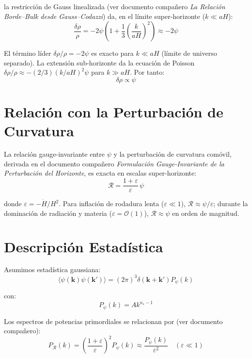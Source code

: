 \documentclass[12pt,a4paper]{article}
\begin{document}
la restricción de Gauss linealizada (ver documento compañero \textit{La Relación Borde--Bulk desde Gauss--Codazzi}) da, en el límite super-horizonte ($k \ll aH$):
\begin{equation}
\frac{\delta\rho}{\rho} = -2\psi\!\left(1 + \frac{1}{3}\!\left(\frac{k}{aH}\right)^{\!2}\right) \approx -2\psi \tag{16}
\end{equation}

El término líder $\delta\rho/\rho = -2\psi$ es exacto para $k \ll aH$ (límite de universo separado). La extensión sub-horizonte da la ecuación de Poisson $\delta\rho/\rho \approx -(2/3)(k/aH)^2\psi$ para $k \gg aH$. Por tanto:
\begin{equation}
\delta\rho \propto \psi \tag{17}
\end{equation}

\section{Relación con la Perturbación de Curvatura}

La relación gauge-invariante entre $\psi$ y la perturbación de curvatura comóvil, derivada en el documento compañero \textit{Formulación Gauge-Invariante de la Perturbación del Horizonte}, es exacta en escalas super-horizonte:
\begin{equation}
\mathcal{R} = \frac{1+\varepsilon}{\varepsilon}\,\psi \tag{18}
\end{equation}

donde $\varepsilon = -\dot{H}/H^2$. Para inflación de rodadura lenta ($\varepsilon \ll 1$), $\mathcal{R} \approx \psi/\varepsilon$; durante la dominación de radiación y materia ($\varepsilon = \mathcal{O}(1)$), $\mathcal{R} \approx \psi$ en orden de magnitud.

\section{Descripción Estadística}

Asumimos estadística gaussiana:
\begin{equation}
\langle\psi(\mathbf{k})\psi(\mathbf{k}')\rangle = (2\pi)^3\delta(\mathbf{k} + \mathbf{k}')P_\psi(k) \tag{19}
\end{equation}

con:
\begin{equation}
P_\psi(k) = Ak^{n_s - 1} \tag{20}
\end{equation}

Los espectros de potencias primordiales se relacionan por (ver documento compañero):
\begin{equation}
P_\mathcal{R}(k) = \left(\frac{1+\varepsilon}{\varepsilon}\right)^2 P_\psi(k) \approx \frac{P_\psi(k)}{\varepsilon^2} \quad (\varepsilon \ll 1) \tag{21}
\end{equation}
\end{document}
